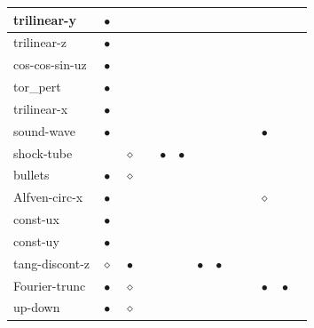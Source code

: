 \documentclass[\mydriver,12pt,twoside,notitlepage,a4paper]{article}
\newcommand{\req}{$\bullet$}
\newcommand{\opt}{$\diamond$}
\begin{document}
\begin{tabular}{@{}l|c|c|c|c|c|c|c|c|c|c|c|c}
\midrule
   trilinear-y      & \req & {}   & {}   & {}   & {}   & {}   & {}
                    & {}   & {}   & {}   & {}   & {}   \\
\midrule
   trilinear-z      & \req & {}   & {}   & {}   & {}   & {}   & {}
                    & {}   & {}   & {}   & {}   & {}   \\
\midrule
   cos-cos-sin-uz   & \req & {}   & {}   & {}   & {}   & {}   & {}
                    & {}   & {}   & {}   & {}   & {}   \\
\midrule
   tor_pert         & \req & {}   & {}   & {}   & {}   & {}   & {}
                    & {}   & {}   & {}   & {}   & {}   \\
\midrule
   trilinear-x      & \req & {}   & {}   & {}   & {}   & {}   & {}
                    & {}   & {}   & {}   & {}   & {}   \\
\midrule
   sound-wave       & \req & {}   & {}   & {}   & {}   & {}   & {}
                    & {}   & {}   & \req & {}   & {}   \\
\midrule
   shock-tube       & {}   & \opt & {}   & \req & \req & {}   & {}
                    & {}   & {}   & {}   & {}   & {}   \\
\midrule
   bullets          & \req & \opt & {}   & {}   & {}   & {}   & {}
                    & {}   & {}   & {}   & {}   & {}   \\
\midrule
   Alfven-circ-x    & \req & {}   & {}   & {}   & {}   & {}   & {}
                    & {}   & {}   & \opt & {}   & {}   \\
\midrule
   const-ux         & \req & {}   & {}   & {}   & {}   & {}   & {}
                    & {}   & {}   & {}   & {}   & {}   \\
\midrule
   const-uy         & \req & {}   & {}   & {}   & {}   & {}   & {}
                    & {}   & {}   & {}   & {}   & {}   \\
\midrule
   tang-discont-z   & \opt & \req & {}   & {}   & {}   & \req & \req
                    & {}   & {}   & {}   & {}   & {}   \\
\midrule
   Fourier-trunc    & \req & \opt & {}   & {}   & {}   & {}   & {}
                    & {}   & {}   & \req & \req & {}   \\
\midrule
   up-down          & \req & \opt & {}   & {}   & {}   & {}   & {}
                    & {}   & {}   & {}   & {}   & {}   \\
%
\bottomrule
\end{tabular}
\end{document}

